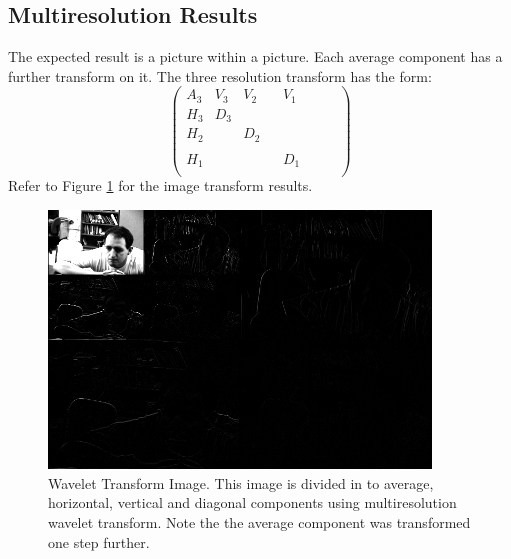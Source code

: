 \subsection {Multiresolution Results}
The expected result is a picture within a picture.  Each average component has a further transform on it.  The three resolution transform has the form:
\[
\left(\begin{array}{cccccccc}A_3 & V_3 & V_2 &  & V_1 &  &  &  \\H_3 & D_3 &  &  &  &  &  &  \\H_2 &  & D_2 &  &  &  &  &  \\ &  &  &  &  &  &  &  \\H_1 &  &  &  & D_1 &  &  &  \\ &  &  &  &  &  &  &  \end{array}\right)
\]
Refer to Figure \ref{wavepicR3} for the image transform results.  

\begin{figure}[htb]
\begin{center}
\includegraphics [width=4in]{wavepic3R.jpg}
\end{center}
\caption{Wavelet Transform Image.  This image is divided in to average, horizontal, vertical and diagonal components using multiresolution wavelet transform.  Note the the average component was transformed one step further. }
\label{wavepicR3}
\end{figure}

